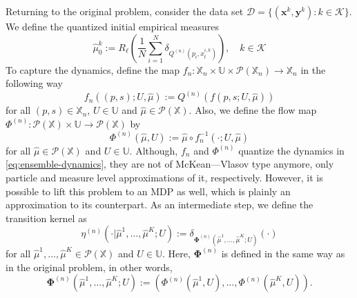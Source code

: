 \documentclass[11pt]{article}
\newcommand{\XX}{\mathbb{X}}
\newcommand{\UU}{\mathbb{U}}
\newcommand{\cD}{\mathcal{D}}
\newcommand{\cK}{\mathcal{K}}
\newcommand{\cP}{\mathcal{P}}
\begin{document}
Returning to the original problem, consider the data set $\cD = \{(\bm{x}^k, \bm{y}^k): k\in\cK\}$. We define the quantized initial empirical measures
\begin{equation*}
    \hat{\mu}_0^k := R_\ell(\frac{1}{N}\sum_{i=1}^N\delta_{Q^{(n)}(p_i, x_t^{i,k})}), \quad k\in\cK
\end{equation*}
To capture the dynamics, define the map $f_n:\XX_n\times\UU\times\cP(\XX_n) \to \XX_n$ in the following way
\begin{equation}
    f_n((p,s); U, \hat{\mu}) := Q^{(n)}(f(p,s;U,\hat{\mu}))
\end{equation}
for all $(p,s)\in\XX_n$, $U\in\UU$ and $\hat{\mu}\in\cP(\XX)$. Also, we define the flow map $\Phi^{(n)}:\cP(\XX)\times\UU\to\cP(\XX)$ by
\begin{equation}
    \Phi^{(n)}(\hat{\mu}, U) := \hat{\mu}\circ f_n^{-1}(\cdot; U, \hat{\mu})
\end{equation}
for all $\hat{\mu}\in\cP(\XX)$ and $U\in\UU$. Although, $f_n$ and $\Phi^{(n)}$ quantize the dynamics in \eqref{eq:ensemble-dynamics}, they are not of McKean---Vlasov type anymore, only particle and measure level approximations of it, respectively. However, it is possible to lift this problem to an MDP as well, which is plainly an approximation to its counterpart. As an intermediate step, we define the transition kernel as
\begin{equation}
    \eta^{(n)}(\cdot|\hat{\mu}^1,\ldots,\hat{\mu}^K; U) := \delta_{\bm{\Phi}^{(n)}(\hat{\mu}^1,\ldots,\hat{\mu}^K; U)}(\cdot)
\end{equation}
for all $\hat{\mu}^1,\ldots,\hat{\mu}^K\in\cP(\XX)$ and $U\in\UU$. Here, $\bm{\Phi}^{(n)}$ is defined in the same way as in the original problem, in other words,
\begin{equation*}
    \bm{\Phi}^{(n)}(\hat{\mu}^1,\ldots,\hat{\mu}^K; U) := (\Phi^{(n)}(\hat{\mu}^1, U),\ldots,\Phi^{(n)}(\hat{\mu}^K,U)).
\end{equation*}
\end{document}
